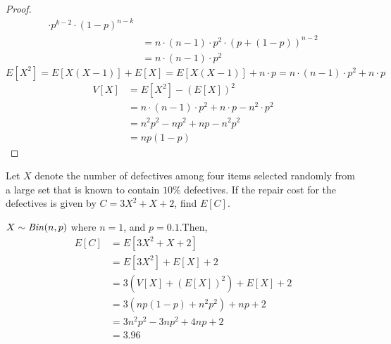 \begin{proof}
\begin{align*}
                       \cdot p^{k - 2} \cdot (1-p)^{n - k}                  \\
                    &= n \cdot (n-1) \cdot p^2 \cdot (p + (1 - p))^{n - 2}  \\
                    &= n \cdot (n-1) \cdot p^2
    \end{align*}
    \begin{equation*}
        E[X^2] = E[X(X - 1)] + E[X] 
               = E[X(X - 1)] + n \cdot p
               = n \cdot (n - 1) \cdot p^2 + n \cdot p
    \end{equation*}
    \begin{align*}
        V[X] &= E[X^2] - (E[X])^2                                           \\
             &= n \cdot (n - 1) \cdot p^2 + n \cdot p - n^2 \cdot p^2       \\
             &= n^2p^2 - np^2 + np - n^2p^2                                 \\
             &= np(1-p)
    \end{align*}
\end{proof}

\begin{example}
    Let $X$ denote the number of defectives among four items selected randomly
from a large set that is known to contain $10\%$ defectives. If the repair cost
for the defectives is given by $C = 3X^2 + X + 2$, find $E[C]$.
\end{example}
\begin{solution}
    $X \sim \text{\emph{Bin}}(n, p)$ where $n = 1$, and $p = 0.1$.Then, 
    \begin{align*}
        E[C] &= E[3X^2 + X + 2]                                             \\
             &= E[3X^2] + E[X] + 2                                          \\
             &= 3 (V[X] + (E[X])^2) + E[X] + 2                              \\
             &= 3 (np(1-p) + n^2p^2) + np + 2                               \\
             &= 3n^2p^2 - 3np^2 + 4np + 2                                   \\
             &= 3.96
    \end{align*}
\end{solution}

